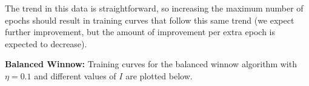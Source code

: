 \documentclass{article}
\begin{document}
The trend in this data is straightforward, so increasing the maximum number of epochs should result in training curves that follow this same trend (we expect further improvement, but the amount of improvement per extra epoch is expected to decrease).

\textbf{Balanced Winnow:} 
Training curves for the balanced winnow algorithm with $\eta = 0.1$ and different values of $I$ are plotted below.

\begin{figure}[H]
        \centering
\end{figure}
\begin{figure}[H]
        \centering
\end{figure}
\end{document}
